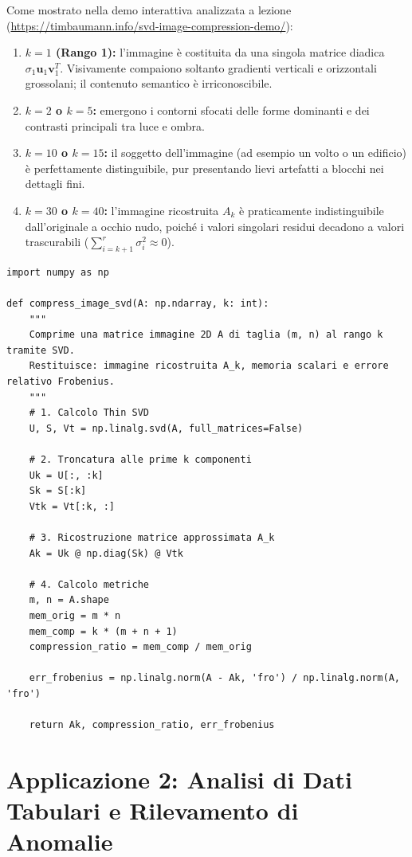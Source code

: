 Come mostrato nella demo interattiva analizzata a lezione (\url{https://timbaumann.info/svd-image-compression-demo/}):
\begin{enumerate}
    \item \textbf{$k = 1$ (Rango 1):} l'immagine \`e costituita da una singola matrice diadica $\sigma_1 \mathbf{u}_1 \mathbf{v}_1^T$. Visivamente compaiono soltanto gradienti verticali e orizzontali grossolani; il contenuto semantico \`e irriconoscibile.
    \item \textbf{$k = 2$ o $k = 5$:} emergono i contorni sfocati delle forme dominanti e dei contrasti principali tra luce e ombra.
    \item \textbf{$k = 10$ o $k = 15$:} il soggetto dell'immagine (ad esempio un volto o un edificio) \`e perfettamente distinguibile, pur presentando lievi artefatti a blocchi nei dettagli fini.
    \item \textbf{$k = 30$ o $k = 40$:} l'immagine ricostruita $A_k$ \`e praticamente indistinguibile dall'originale a occhio nudo, poich\'e i valori singolari residui decadono a valori trascurabili ($\sum_{i=k+1}^r \sigma_i^2 \approx 0$).
\end{enumerate}

\begin{lstlisting}[style=pythoncode, caption={Implementazione Python di compressione immagini e calcolo dell'errore relativo con SVD.}]
import numpy as np

def compress_image_svd(A: np.ndarray, k: int):
    """
    Comprime una matrice immagine 2D A di taglia (m, n) al rango k tramite SVD.
    Restituisce: immagine ricostruita A_k, memoria scalari e errore relativo Frobenius.
    """
    # 1. Calcolo Thin SVD
    U, S, Vt = np.linalg.svd(A, full_matrices=False)
    
    # 2. Troncatura alle prime k componenti
    Uk = U[:, :k]
    Sk = S[:k]
    Vtk = Vt[:k, :]
    
    # 3. Ricostruzione matrice approssimata A_k
    Ak = Uk @ np.diag(Sk) @ Vtk
    
    # 4. Calcolo metriche
    m, n = A.shape
    mem_orig = m * n
    mem_comp = k * (m + n + 1)
    compression_ratio = mem_comp / mem_orig
    
    err_frobenius = np.linalg.norm(A - Ak, 'fro') / np.linalg.norm(A, 'fro')
    
    return Ak, compression_ratio, err_frobenius
\end{lstlisting}

\FloatBarrier
\section{Applicazione 2: Analisi di Dati Tabulari e Rilevamento di Anomalie}
\label{sec:applicazione-dati-tabulari-anomalie}

